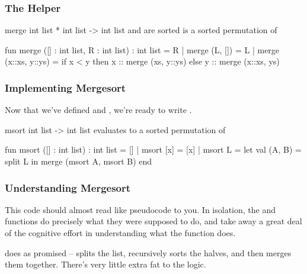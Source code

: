 \documentclass[aspectratio=169, handout]{beamer}
\begin{document}
\begin{frame}[fragile]
  \frametitle{The  Helper}

  \spec
    {merge}
    {int list * int list -> int list}
    { and  are sorted}
    { is a sorted permutation of }

  \pause
  \vspace{\fill}

  \begin{codeblock}
    fun merge ([] : int list, R : int list) : int list = R
      | merge (L, []) = L
      | merge (x::xs, y::ys) =
          if x < y then
            x :: merge (xs, y::ys)
          else
            y :: merge (x::xs, ys)
  \end{codeblock}
\end{frame}

\begin{frame}[fragile]
  \frametitle{Implementing Mergesort}

  Now that we've defined  and , we're ready to write .

  \pause
  \vspace{\fill}

  \spec
    {msort}
    {int list -> int list}
    {}
    { evaluates to a sorted permutation of }

  \pause
  \vspace{\fill}

  \begin{codeblock}
    fun msort ([] : int list) : int list = []
      | msort [x] = [x]
      | msort L =
          let
            val (A, B) = split L
          in
            merge (msort A, msort B)
          end
  \end{codeblock}
\end{frame}

\begin{frame}[fragile]
  \frametitle{Understanding Mergesort}

  \rprs

  This code should almost read like pseudocode to you. In isolation, the
   and  functions do precisely what they were supposed
  to do, and take away a great deal of the cognitive effort in understanding
  what the  function does.

  \pause
  \vspace{\fill}

   does as promised -- splits the list, recursively sorts the
  halves, and then merges them together. There's very little extra fat to the
  logic.

  \pause
  \vspace{\fill}

\end{frame}
\end{document}
